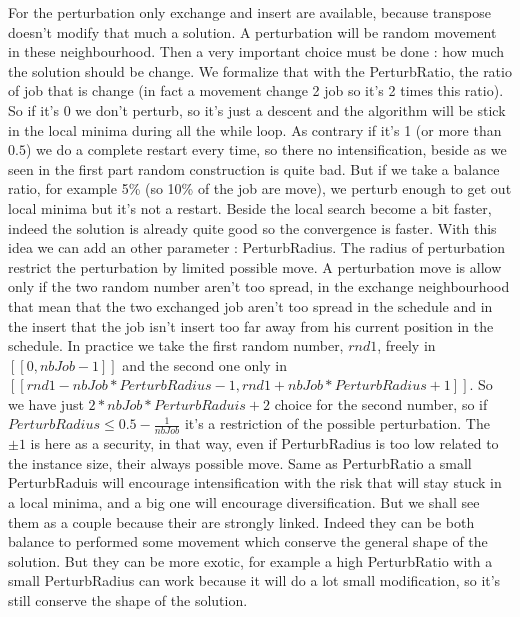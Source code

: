 \documentclass[12pt,a4paper]{article}
\begin{document}
For the perturbation only exchange and insert are available, because transpose doesn't modify that much a solution. A perturbation will be random movement in these neighbourhood. Then a very important choice must be done : how much the solution should be change. We formalize that with the PerturbRatio, the ratio of job that is change (in fact a movement change 2 job so it's 2 times this ratio). So if it's 0 we don't perturb, so it's just a descent and the algorithm will be stick in the local minima during all the while loop. As contrary if it's 1 (or more than $0.5$) we do a complete restart every time, so there no intensification, beside as we seen in the first part random construction is quite bad. But if we take a balance ratio, for example 5\% (so 10\% of the job are move), we perturb enough to get out local minima but it's not a restart. Beside the local search become a bit faster, indeed the solution is already quite good so the convergence is faster. With this idea we can add an other parameter : PerturbRadius. The radius of perturbation restrict the perturbation by limited possible move. A perturbation move is allow only if the two random number aren't too spread, in the exchange neighbourhood that mean that the two exchanged job aren't too spread in the schedule and in the insert that the job isn't insert too far away from his current position in the schedule. In practice we take the first random number, $rnd1$, freely in $[\![ 0 , nbJob-1 ]\!]$ and the second one only in $[\![ rnd1 - nbJob*PerturbRadius -1 , rnd1 + nbJob*PerturbRadius +1 ]\!]$. So we have just $2*nbJob*PerturbRaduis +2$ choice for the second number, so if $PerturbRadius \leqslant 0.5 - \frac{1}{nbJob}$ it's a restriction of the possible perturbation. The $\pm 1$ is here as a security, in that way, even if PerturbRadius is too low related to the instance size, their always possible move. Same as PerturbRatio a small PerturbRaduis will encourage intensification with the risk that will stay stuck in a local minima, and a big one will encourage diversification. But we shall see them as a couple because their are strongly linked. Indeed they can be both balance to performed some movement which conserve the general shape of the solution. But they can be more exotic, for example a high PerturbRatio with a small PerturbRadius can work because it will do a lot small modification, so it's still conserve the shape of the solution.
\end{document}
